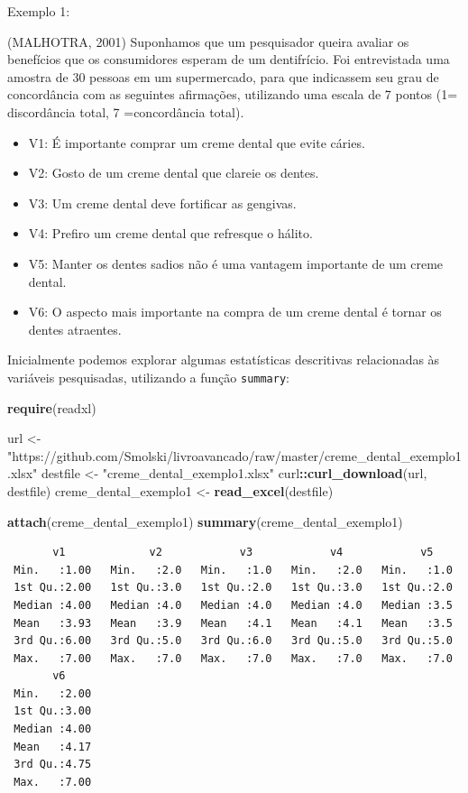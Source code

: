 \documentclass[12pt,brazil,oneside]{book}
\newenvironment{Shaded}{\begin{snugshade}}{\end{snugshade}}
\newcommand{\KeywordTok}[1]{\textcolor[rgb]{0.13,0.29,0.53}{\textbf{#1}}}
\newcommand{\NormalTok}[1]{#1}
\newcommand{\OperatorTok}[1]{\textcolor[rgb]{0.81,0.36,0.00}{\textbf{#1}}}
\newcommand{\StringTok}[1]{\textcolor[rgb]{0.31,0.60,0.02}{#1}}
\providecommand{\tightlist}{%
  \setlength{\itemsep}{0pt}\setlength{\parskip}{0pt}}
\begin{document}
Exemplo 1:

(MALHOTRA, 2001) Suponhamos que um pesquisador queira avaliar os benefícios que os consumidores esperam de um dentifrício. Foi entrevistada uma amostra de 30 pessoas em um supermercado, para que indicassem seu grau de concordância com as seguintes afirmações, utilizando uma escala de 7 pontos (1= discordância total, 7 =concordância total).

\begin{itemize}
\tightlist
\item
  V1: É importante comprar um creme dental que evite cáries.
\item
  V2: Gosto de um creme dental que clareie os dentes.
\item
  V3: Um creme dental deve fortificar as gengivas.
\item
  V4: Prefiro um creme dental que refresque o hálito.
\item
  V5: Manter os dentes sadios não é uma vantagem importante de um creme dental.
\item
  V6: O aspecto mais importante na compra de um creme dental é tornar os dentes atraentes.
\end{itemize}

Inicialmente podemos explorar algumas estatísticas descritivas relacionadas às variáveis pesquisadas, utilizando a função \texttt{summary}:

\begin{Shaded}
\begin{Highlighting}[]
\KeywordTok{require}\NormalTok{(readxl)}

\NormalTok{url <-}\StringTok{ "https://github.com/Smolski/livroavancado/raw/master/creme_dental_exemplo1.xlsx"}
\NormalTok{destfile <-}\StringTok{ "creme_dental_exemplo1.xlsx"}
\NormalTok{curl}\OperatorTok{::}\KeywordTok{curl_download}\NormalTok{(url, destfile)}
\NormalTok{creme_dental_exemplo1 <-}\StringTok{ }\KeywordTok{read_excel}\NormalTok{(destfile)}

\KeywordTok{attach}\NormalTok{(creme_dental_exemplo1)}
\KeywordTok{summary}\NormalTok{(creme_dental_exemplo1)}
\end{Highlighting}
\end{Shaded}

\begin{verbatim}
       v1             v2            v3            v4            v5     
 Min.   :1.00   Min.   :2.0   Min.   :1.0   Min.   :2.0   Min.   :1.0  
 1st Qu.:2.00   1st Qu.:3.0   1st Qu.:2.0   1st Qu.:3.0   1st Qu.:2.0  
 Median :4.00   Median :4.0   Median :4.0   Median :4.0   Median :3.5  
 Mean   :3.93   Mean   :3.9   Mean   :4.1   Mean   :4.1   Mean   :3.5  
 3rd Qu.:6.00   3rd Qu.:5.0   3rd Qu.:6.0   3rd Qu.:5.0   3rd Qu.:5.0  
 Max.   :7.00   Max.   :7.0   Max.   :7.0   Max.   :7.0   Max.   :7.0  
       v6      
 Min.   :2.00  
 1st Qu.:3.00  
 Median :4.00  
 Mean   :4.17  
 3rd Qu.:4.75  
 Max.   :7.00  
\end{verbatim}
\end{document}
